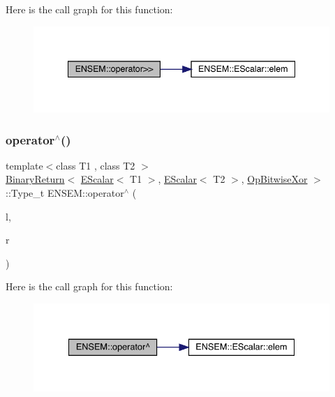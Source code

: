 Here is the call graph for this function\+:
\nopagebreak
\begin{figure}[H]
\begin{center}
\leavevmode
\includegraphics[width=341pt]{d4/dca/group__escalar_gacaa61f35659a0336281352bbdbef1112_cgraph}
\end{center}
\end{figure}
\mbox{\label{group__escalar_ga61ae38c220aff90c4be30fbab0974540}} 
\subsubsection{\texorpdfstring{operator$^\wedge$()}{operator^()}}
{\footnotesize\ttfamily template$<$class T1 , class T2 $>$ \\
\mbox{\hyperlink{structENSEM_1_1BinaryReturn}{Binary\+Return}}$<$ \mbox{\hyperlink{classENSEM_1_1EScalar}{E\+Scalar}}$<$ T1 $>$, \mbox{\hyperlink{classENSEM_1_1EScalar}{E\+Scalar}}$<$ T2 $>$, \mbox{\hyperlink{structENSEM_1_1OpBitwiseXor}{Op\+Bitwise\+Xor}} $>$\+::Type\+\_\+t E\+N\+S\+E\+M\+::operator$^\wedge$ (\begin{DoxyParamCaption}\item[{const \mbox{\hyperlink{classENSEM_1_1EScalar}{E\+Scalar}}$<$ T1 $>$ \&}]{l,  }\item[{const \mbox{\hyperlink{classENSEM_1_1EScalar}{E\+Scalar}}$<$ T2 $>$ \&}]{r }\end{DoxyParamCaption})\hspace{0.3cm}{\ttfamily [inline]}}

Here is the call graph for this function\+:
\nopagebreak
\begin{figure}[H]
\begin{center}
\leavevmode
\includegraphics[width=334pt]{d4/dca/group__escalar_ga61ae38c220aff90c4be30fbab0974540_cgraph}
\end{center}
\end{figure}
\mbox{\label{group__escalar_gadc4bc2eaed30b8d8661741f6ece0de03}} 
